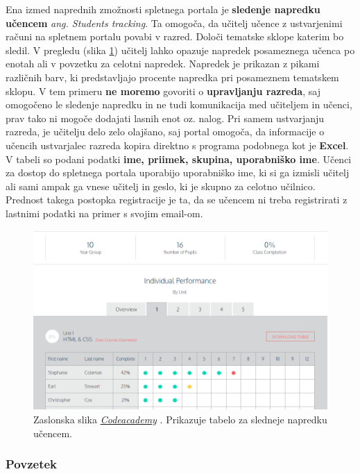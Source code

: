 Ena izmed naprednih zmožnosti spletnega portala je \textbf{sledenje
  napredku učencem} \emph{ang. Students tracking}. Ta omogoča, da
učitelj učence z ustvarjenimi računi na spletnem portalu povabi v
razred. Določi tematske sklope katerim bo sledil. V pregledu (slika
\ref{fig:scr:web:codeacademy:tracking}) učitelj lahko opazuje napredek
posameznega učenca po enotah ali v povzetku za celotni
napredek. Napredek je prikazan z pikami različnih barv, ki
predstavljajo procente napredka pri posameznem tematskem sklopu. V tem
primeru \textbf{ne moremo} govoriti o \textbf{upravljanju razreda},
saj omogočeno le sledenje napredku in ne tudi komunikacija med
učiteljem in učenci, prav tako ni mogoče dodajati lasnih enot
oz. nalog. Pri samem ustvarjanju razreda, je učitelju delo zelo
olajšano, saj portal omogoča, da informacije o učencih ustvarjalec
razreda kopira direktno s programa podobnega kot je \textbf{Excel}. V
tabeli so podani podatki \textbf{ime, priimek, skupina, uporabniško
  ime}. Učenci za dostop do spletnega portala uporabijo uporabniško
ime, ki si ga izmisli učitelj ali sami ampak ga vnese učitelj in
geslo, ki je skupno za celotno učilnico. Prednost takega postopka
registracije je ta, da se učencem ni treba registrirati z lastnimi
podatki na primer s svojim email-om.

\begin{figure}[h!]
  \centering
    \includegraphics [width=0.65\linewidth, keepaspectratio =
   1] {./images/sc_web/codeacademy_tracking_01.png}
   \caption{Zaslonska slika
     \emph{\href{https://www.codecademy.com/}{Codeacademy}}
     \cite{web:codeacademy}. Prikazuje tabelo za sledneje napredku
     učencem.}
    \label{fig:scr:web:codeacademy:tracking}
\end{figure}


\subsubsection{Povzetek}

